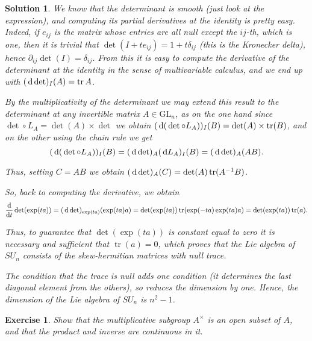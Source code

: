 \documentclass{article}
\newtheorem{ex}{Exercise}
\theoremstyle{nonumberplain}
\newtheorem{sol}{Solution}
\DeclareMathOperator{\trace}{tr}
\newcommand{\GL}{\mathrm{GL}}
\begin{document}
\begin{sol}
We know that the determinant is smooth (just look at the expression), and computing its partial derivatives at the identity is pretty easy. Indeed, if $e_{ij}$ is the matrix whose entries are all null except the $ij$-th, which is one, then it is trivial that $\det(I + t e_{ij}) = 1 + t \delta_{ij}$ (this is the Kronecker delta), hence $\partial_{ij} \det(I) = \delta_{ij}$. From this it is easy to compute the derivative of the determinant at the identity in the sense of multivariable calculus, and we end up with $(\dl \det)_I(A) = \trace A$.

By the multiplicativity of the determinant we may extend this result to the determinant at any invertible matrix $A \in \GL_n$, as on the one hand since $\det \circ L_A = \det(A) \times \det$ we obtain $(\dl (\det \circ L_A))_I(B) = \det(A) \times \trace(B)$, and on the other using the chain rule we get
\begin{equation}
(\dl (\det \circ L_A))_I(B) = (\dl \det)_A (\dl L_A)_I (B) = (\dl \det)_A (AB).
\end{equation}

Thus, setting $C = AB$ we obtain $(\dl \det)_A(C) = \det(A) \trace(A^{-1} B)$.

So, back to computing the derivative, we obtain
\begin{equation}
\diff{}t \det(\exp(ta)) = (\dl \det)_{\exp(ta)}(\exp(ta) a) = \det(\exp(ta)) \trace(\exp(-ta) \exp(ta) a) = \det(\exp(ta)) \trace(a).
\end{equation}

Thus, to guarantee that $\det(\exp(ta))$ is constant equal to zero it is necessary and sufficient that $\trace(a) = 0$, which proves that the Lie algebra of $SU_n$ consists of the skew-hermitian matrices with null trace.

The condition that the trace is null adds one condition (it determines the last diagonal element from the others), so reduces the dimension by one. Hence, the dimension of the Lie algebra of $SU_n$ is $n^2 - 1$.
\end{sol}

\begin{ex}
Show that the multiplicative subgroup $A^\times$ is an open subset of $A$, and that the product and inverse are continuous in it.
\end{ex}
\end{document}
